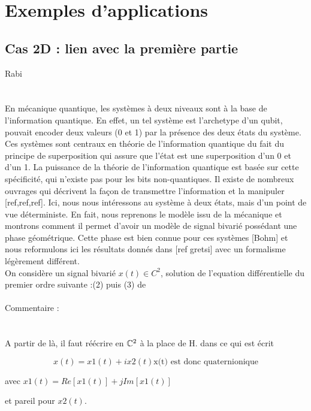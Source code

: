 \section{\todo Exemples d'applications} \label{sec:exemples_appli}

\subsection{\todo Cas 2D : lien avec la première partie} \label{subsec:ex-2D}

 Rabi
\\ \\ \\
En mécanique quantique, les systèmes à deux niveaux sont à la base de l'information quantique. En effet, un tel système est l'archetype d'un qubit, pouvait encoder deux valeurs (0 et 1) par la présence des deux états du système. Ces systèmes sont centraux en théorie de l'information quantique du fait du principe de superposition qui assure que l'état est une superposition d'un 0 et d'un 1. La puissance de la théorie de l'information quantique est basée sur cette spécificité, qui n'existe pas pour les bits non-quantiques. Il existe de nombreux ouvrages qui décrivent la façon de transmettre l'information et la manipuler [ref,ref,ref].
Ici, nous nous intéressons au système à deux états, mais d'un point de vue déterministe. En fait, nous reprenons le modèle issu de la mécanique et montrons comment il permet d'avoir un modèle de signal bivarié possédant une phase géométrique. Cette phase est bien connue pour ces systèmes [Bohm] et nous reformulons ici les résultats donnés dans [ref gretsi] avec un formalisme légèrement différent.
\\ 

On considère un signal bivarié $x(t) \in C^2$, solution de l'equation différentielle du premier ordre suivante :(2) puis (3) de  \cite{le_bihan_modephysiques_2023}
\\ \\

 Commentaire : 
\\ \\ \\
A partir de là, il faut réécrire en $\mathbb{C}^2$ à la place de H.
dans ce qui est écrit 

\[x(t) = x1(t) + i x2(t) \text{x(t) est donc quaternionique}\] 

avec $x1(t) = Re[x1(t)] + j Im[x1(t)]$

et pareil pour $x2(t)$.


